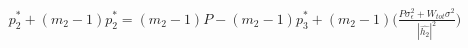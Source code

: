 \documentclass[preview]{standalone}
\begin{document}
\begin{align*}
p_2^\ast + \left(m_2 - 1\right) p_2^\ast = \left(m_2 - 1\right) P - \left(m_2 - 1\right) p_3^\ast + \left(m_2 - 1\right) \Bigg( \frac{P \sigma_\epsilon^2 + W_{tot} \sigma^2}{\left|\hat{h_2}\right|^2} \Bigg)
\end{align*}
\end{document}
